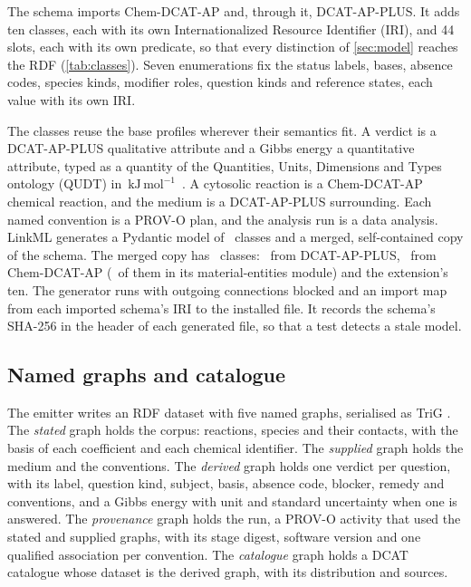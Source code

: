 \documentclass[5p]{elsarticle}
\theoremstyle{definition}
\theoremstyle{plain}
\newcommand{\kJ}{\ensuremath{\,\mathrm{kJ\,mol^{-1}}}}
\begin{document}
The schema imports Chem-DCAT-AP and, through it, DCAT-AP-PLUS.
It adds ten classes, each with its own Internationalized Resource Identifier (IRI), and 44 slots, each with its own predicate, so that every distinction of \cref{sec:model} reaches the RDF (\cref{tab:classes}).
Seven enumerations fix the status labels, bases, absence codes, species kinds, modifier roles, question kinds and reference states, each value with its own IRI.


The classes reuse the base profiles wherever their semantics fit.
A verdict is a DCAT-AP-PLUS qualitative attribute and a Gibbs energy a quantitative attribute, typed as a quantity of the Quantities, Units, Dimensions and Types ontology (QUDT) in \kJ\ \citep{qudt}.
A cytosolic reaction is a Chem-DCAT-AP chemical reaction, and the medium is a DCAT-AP-PLUS surrounding.
Each named convention is a PROV-O plan, and the analysis run is a data analysis.
LinkML generates a Pydantic model of \xPydantic\ classes and a merged, self-contained copy of the schema.
The merged copy has \xSchemaClasses\ classes: \xCoreClasses\ from DCAT-AP-PLUS, \xChemClasses\ from Chem-DCAT-AP (\xMaterialsClasses\ of them in its material-entities module) and the extension's ten.
The generator runs with outgoing connections blocked and an import map from each imported schema's IRI to the installed file.
It records the schema's SHA-256 in the header of each generated file, so that a test detects a stale model.

\subsection{Named graphs and catalogue}
\label{sec:graphs}

The emitter writes an RDF dataset with five named graphs, serialised as TriG \citep{w3c2014trig}.
The \emph{stated} graph holds the corpus: reactions, species and their contacts, with the basis of each coefficient and each chemical identifier.
The \emph{supplied} graph holds the medium and the conventions.
The \emph{derived} graph holds one verdict per question, with its label, question kind, subject, basis, absence code, blocker, remedy and conventions, and a Gibbs energy with unit and standard uncertainty when one is answered.
The \emph{provenance} graph holds the run, a PROV-O activity that used the stated and supplied graphs, with its stage digest, software version and one qualified association per convention.
The \emph{catalogue} graph holds a DCAT catalogue whose dataset is the derived graph, with its distribution and sources.
\end{document}
